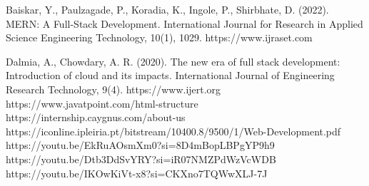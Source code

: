 \documentclass[12pt,a4paper]{report}
\begin{document}


\thispagestyle{empty}





\tableofcontents
\newpage
{}
\listoffigures

\newpage
{}
\listoftables

\newpage

\pagestyle{fancy}
\fancyhead[LO]{\footnotesize{\textit{}}}
\renewcommand{\footrulewidth}{0.5pt}
\fancyfoot[RO]{\footnotesize{\textit{\thepage }}}
\cfoot{}











\footnotesize 
{}
\renewcommand\bibname{References}
\begin{thebibliography}{1}


Baiskar, Y., Paulzagade, P., Koradia, K., Ingole, P., Shirbhate, D. (2022). MERN: A Full-Stack Development. International Journal for Research in Applied Science  Engineering Technology, 10(1), 1029. https://www.ijraset.com

Dalmia, A.,  Chowdary, A. R. (2020). The new era of full stack development: Introduction of cloud and its impacts. International Journal of Engineering Research  Technology, 9(4). https://www.ijert.org
https://www.javatpoint.com/html-structure
https://internship.caygnus.com/about-us
https://iconline.ipleiria.pt/bitstream/10400.8/9500/1/Web-Development.pdf
https://youtu.be/EkRuAOsmXm0?si=8D4mBopLBPgYP9h9
https://youtu.be/Dtb3DdSvYRY?si=iR07NMZPdWzVcWDB
https://youtu.be/IKOwKiVt-x8?si=CKXno7TQWwXLJ-7J
\end{thebibliography}
\normalsize


\end{document}
